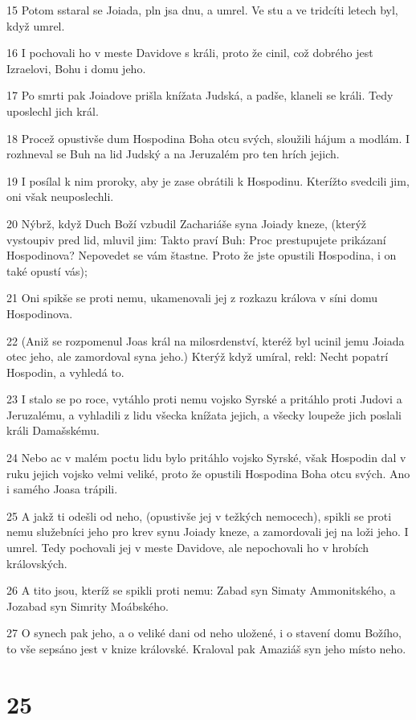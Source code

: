 \par 15 Potom sstaral se Joiada, pln jsa dnu, a umrel. Ve stu a ve tridcíti letech byl, když umrel.
\par 16 I pochovali ho v meste Davidove s králi, proto že cinil, což dobrého jest Izraelovi, Bohu i domu jeho.
\par 17 Po smrti pak Joiadove prišla knížata Judská, a padše, klaneli se králi. Tedy uposlechl jich král.
\par 18 Procež opustivše dum Hospodina Boha otcu svých, sloužili hájum a modlám. I rozhneval se Buh na lid Judský a na Jeruzalém pro ten hrích jejich.
\par 19 I posílal k nim proroky, aby je zase obrátili k Hospodinu. Kterížto svedcili jim, oni však neuposlechli.
\par 20 Nýbrž, když Duch Boží vzbudil Zachariáše syna Joiady kneze, (kterýž vystoupiv pred lid, mluvil jim: Takto praví Buh: Proc prestupujete prikázaní Hospodinova? Nepovedet se vám štastne. Proto že jste opustili Hospodina, i on také opustí vás);
\par 21 Oni spikše se proti nemu, ukamenovali jej z rozkazu králova v síni domu Hospodinova.
\par 22 (Aniž se rozpomenul Joas král na milosrdenství, kteréž byl ucinil jemu Joiada otec jeho, ale zamordoval syna jeho.) Kterýž když umíral, rekl: Necht popatrí Hospodin, a vyhledá to.
\par 23 I stalo se po roce, vytáhlo proti nemu vojsko Syrské a pritáhlo proti Judovi a Jeruzalému, a vyhladili z lidu všecka knížata jejich, a všecky loupeže jich poslali králi Damašskému.
\par 24 Nebo ac v malém poctu lidu bylo pritáhlo vojsko Syrské, však Hospodin dal v ruku jejich vojsko velmi veliké, proto že opustili Hospodina Boha otcu svých. Ano i samého Joasa trápili.
\par 25 A jakž ti odešli od neho, (opustivše jej v težkých nemocech), spikli se proti nemu služebníci jeho pro krev synu Joiady kneze, a zamordovali jej na loži jeho. I umrel. Tedy pochovali jej v meste Davidove, ale nepochovali ho v hrobích královských.
\par 26 A tito jsou, kteríž se spikli proti nemu: Zabad syn Simaty Ammonitského, a Jozabad syn Simrity Moábského.
\par 27 O synech pak jeho, a o veliké dani od neho uložené, i o stavení domu Božího, to vše sepsáno jest v knize královské. Kraloval pak Amaziáš syn jeho místo neho.

\chapter{25}

